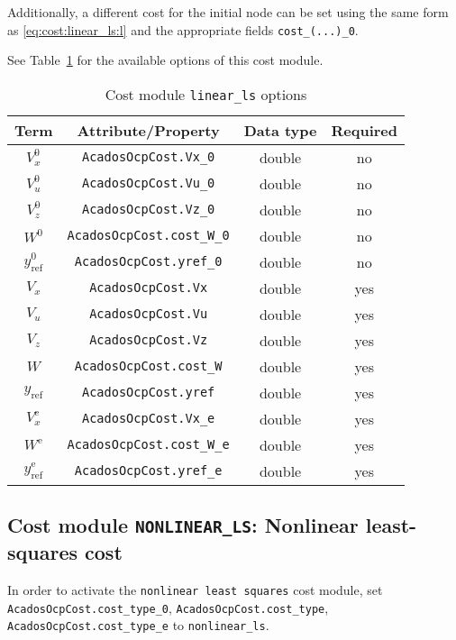 \documentclass[english]{article}
\newcommand{\code}[1]{\texttt{#1}}
\newcommand{\ind}[1]{_{\textrm{#1}}}
\newcommand{\terminal}{^{\textrm{e}}}
\newcommand{\initial}{^{\textrm{0}}}
\newcommand{\mandatory}{yes}
\newcommand{\optional}{no}
\begin{document}
Additionally, a different cost for the initial node can be set using the same form as \eqref{eq:cost:linear_ls:l} and the appropriate fields \code{cost\_(...)\_0}.

See Table~\ref{tab:cost:linear_ls} for the available options of this cost module.
%
\begin{table}[ht!]
    \centering
    \caption{Cost module \code{linear\_ls} options} \label{tab:cost:linear_ls}
    \begin{tabular}{cccc}
        \toprule
        Term & Attribute/Property & Data type & Required \\ \midrule
        $ V_x\initial $ & \code{AcadosOcpCost.Vx\_0}    & double & \optional   \\
        $ V_u\initial $ & \code{AcadosOcpCost.Vu\_0}    & double & \optional   \\
        $ V_z\initial $ & \code{AcadosOcpCost.Vz\_0}    & double & \optional  \\
        $ W\initial $ & \code{AcadosOcpCost.cost\_W\_0}    & double & \optional  \\
        $ y\ind{ref}\initial $ & \code{AcadosOcpCost.yref\_0}    & double & \optional   \\ [1em]
        $ V_x $ & \code{AcadosOcpCost.Vx}    & double & \mandatory   \\
        $ V_u $ & \code{AcadosOcpCost.Vu}    & double & \mandatory   \\
        $ V_z $ & \code{AcadosOcpCost.Vz}    & double & \mandatory  \\
        $ W $ & \code{AcadosOcpCost.cost\_W}    & double & \mandatory  \\
        $ y\ind{ref} $ & \code{AcadosOcpCost.yref}    & double & \mandatory   \\ [1em]
        $ V_x\terminal $ & \code{AcadosOcpCost.Vx\_e}    & double  & \mandatory  \\
        $ W\terminal $ & \code{AcadosOcpCost.cost\_W\_e}    & double & \mandatory   \\
        $ y\ind{ref}\terminal $ & \code{AcadosOcpCost.yref\_e}   & double & \mandatory   \\
        \bottomrule
    \end{tabular}
\end{table}
%
\subsection{Cost module \code{NONLINEAR\_LS}: Nonlinear least-squares cost}\label{sec:cost:nonlinear_ls}
%
In order to activate the \code{nonlinear least squares} cost module, set \code{AcadosOcpCost.cost\_type\_0}, \code{AcadosOcpCost.cost\_type}, \code{AcadosOcpCost.cost\_type\_e} to \code{nonlinear\_ls}.
\end{document}
